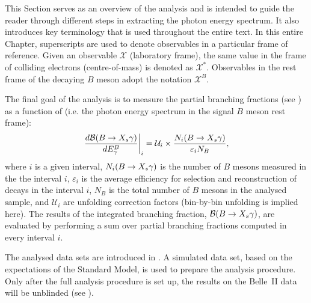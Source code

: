 This Section serves as an overview of the analysis
and is intended to guide the reader through different steps in extracting the \BtoXsgamma photon energy spectrum.
It also introduces key terminology that is used throughout the entire text.
In this entire Chapter, superscripts are used to denote observables in a particular frame of reference.
Given an observable $\mathcal{X}$ (laboratory frame), the same value in the frame of colliding electrons (centre-of-mass) is denoted as $\mathcal{X}^*$.
Observables in the rest frame of the decaying $B$ meson adopt the notation $\mathcal{X}^B$.

The final goal of the analysis is to measure the partial branching fractions (see )
as a function of \EB (i.e. the photon energy spectrum in the signal $B$ meson rest frame):
\begin{equation}\label{eq:branching_fraction_recipe}
    \left.\frac{d\mathcal{B}(\BtoXsgamma)}{d\EB}\right|_i = \mathcal{U}_i \times \frac{N_i(\BtoXsgamma)}{\varepsilon_i N_{B}},
\end{equation}
where $i$ is a given \EB interval,
$N_i(\BtoXsgamma)$ is the number of $B$ mesons measured in the the interval $i$, 
$\varepsilon_i$ is the average efficiency for selection and reconstruction of \BtoXsgamma decays in the interval $i$,
$N_B$ is the total number of $B$ mesons in the analysed sample,
and $\mathcal{U}_i$ are unfolding correction factors (bin-by-bin unfolding is implied here).
The results of the integrated branching fraction, $\mathcal{B}(\BtoXsgamma)$, are evaluated by performing a sum over partial branching fractions computed in every interval $i$.

The analysed data sets are introduced in .
A simulated data set, based on the expectations of the Standard Model, is used to prepare the analysis procedure.
Only after the full analysis procedure is set up, the results on the Belle~II data will be unblinded (see ).

